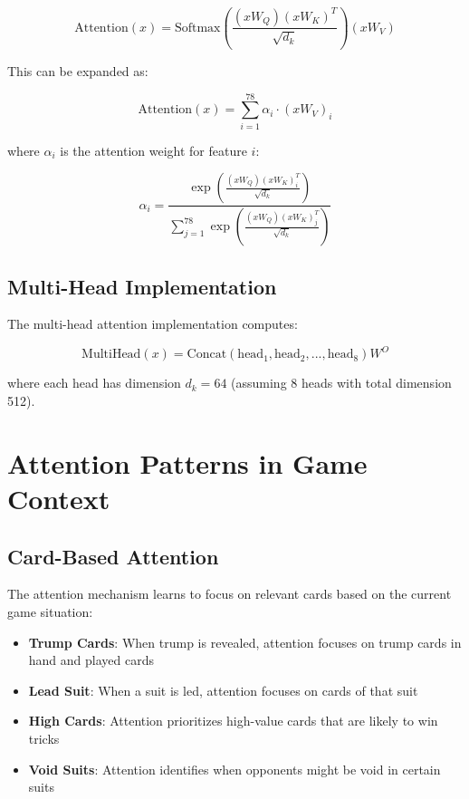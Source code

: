\documentclass[conference]{IEEEtran}
\begin{document}
\begin{equation}
\text{Attention}(x) = \text{Softmax}\left(\frac{(xW_Q)(xW_K)^T}{\sqrt{d_k}}\right)(xW_V)
\end{equation}

This can be expanded as:

\begin{equation}
\text{Attention}(x) = \sum_{i=1}^{78} \alpha_i \cdot (xW_V)_i
\end{equation}

where $\alpha_i$ is the attention weight for feature $i$:

\begin{equation}
\alpha_i = \frac{\exp\left(\frac{(xW_Q)(xW_K)_i^T}{\sqrt{d_k}}\right)}{\sum_{j=1}^{78} \exp\left(\frac{(xW_Q)(xW_K)_j^T}{\sqrt{d_k}}\right)}
\end{equation}

\subsection{Multi-Head Implementation}

The multi-head attention implementation computes:

\begin{equation}
\text{MultiHead}(x) = \text{Concat}(\text{head}_1, \text{head}_2, ..., \text{head}_8)W^O
\end{equation}

where each head has dimension $d_k = 64$ (assuming 8 heads with total dimension 512).

\section{Attention Patterns in Game Context}

\subsection{Card-Based Attention}

The attention mechanism learns to focus on relevant cards based on the current game situation:

\begin{itemize}
    \item \textbf{Trump Cards}: When trump is revealed, attention focuses on trump cards in hand and played cards
    \item \textbf{Lead Suit}: When a suit is led, attention focuses on cards of that suit
    \item \textbf{High Cards}: Attention prioritizes high-value cards that are likely to win tricks
    \item \textbf{Void Suits}: Attention identifies when opponents might be void in certain suits
\end{itemize}
\end{document}
